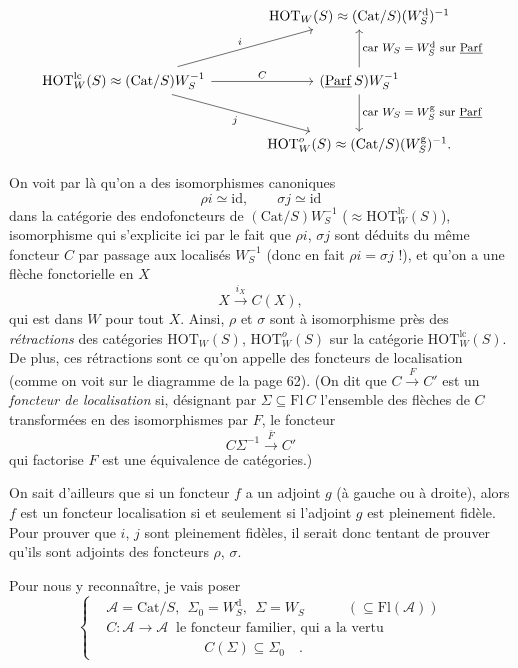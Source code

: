 \documentclass[11pt]{article}
\newcommand{\printedpage}[1]{\marginpar{\footnotesize p.~#1}}
\newcommand{\msp}[1]{\marginpar{\footnotesize [#1]}}
\newcommand{\HOT}{\mathrm{HOT}}
\newcommand{\Cat}{\mathrm{Cat}}
\newcommand{\Fl}{\mathrm{Fl}}
\newcommand{\id}{\mathrm{id}}
\newcommand{\cA}{\mathcal{A}}
\newcommand{\ul}[1]{\underline{\mathrm{#1}}}
\begin{document}
\printedpage{39}

\[
\begin{tikzcd}[column sep=large, row sep=large]
 & \HOT_W(S)\approx(\Cat/S)(W_S^{\mathrm{d}})^{-1} \\
\HOT^{\mathrm{lc}}_W(S)\approx(\Cat/S)W_S^{-1} \arrow[ur, "i"] \arrow[r, "C"] \arrow[dr, "j"'] & (\ul{Parf}\,S)W_S^{-1} \arrow[u, "\text{\footnotesize car $W_S=W_S^{\mathrm{d}}$ sur $\ul{Parf}$}"'] \arrow[d, "\text{\footnotesize car $W_S=W_S^{\mathrm{g}}$ sur $\ul{Parf}$}"] \\
 & \HOT^{o}_W(S)\approx(\Cat/S)(W_S^{\mathrm{g}})^{-1}.
\end{tikzcd}
\]

\msp{page 64}
On voit par là qu'on a des isomorphismes canoniques
\[
\rho i\simeq\id,\qquad\sigma j\simeq\id
\]
dans la catégorie des endofoncteurs de $(\Cat/S)W_S^{-1}$ ($\approx\HOT^{\mathrm{lc}}_W(S)$), isomorphisme qui s'explicite ici par le fait que $\rho i$, $\sigma j$ sont déduits du même foncteur $C$ par passage aux localisés $W_S^{-1}$ (donc en fait $\rho i=\sigma j$ !), et qu'on a une flèche fonctorielle en $X$
\[
X\xrightarrow{i_X}C(X),
\]
qui est dans $W$ pour tout $X$. Ainsi, $\rho$ et $\sigma$ sont à isomorphisme près des \textit{rétractions} des catégories $\HOT_W(S)$, $\HOT^{o}_W(S)$ sur la catégorie $\HOT^{\mathrm{lc}}_W(S)$. De plus, ces rétractions sont ce qu'on appelle des foncteurs de localisation (comme on voit sur le diagramme de la page 62). (On dit que $C\xrightarrow{F}C'$ est un \textit{foncteur de localisation} si, désignant par $\Sigma\subseteq\Fl\,C$ l'ensemble des flèches de $C$ transformées en des isomorphismes par $F$, le foncteur
\[
C\Sigma^{-1}\xrightarrow{\bar{F}}C'
\]
qui factorise $F$ est une équivalence de catégories.)

\msp{page 65}
On sait d'ailleurs que si un foncteur $f$ a un adjoint $g$ (à gauche ou à droite), alors $f$ est un foncteur localisation si et seulement si l'adjoint $g$ est pleinement fidèle. Pour prouver que $i$, $j$ sont pleinement fidèles, il serait donc tentant de prouver qu'ils sont adjoints des foncteurs $\rho$, $\sigma$.

Pour nous y reconnaître, je vais poser
\[
\left\{
\begin{aligned}
&\cA=\Cat/S,\ \ \Sigma_0=W_S^{\mathrm{d}},\ \ \Sigma=W_S\qquad\quad(\subseteq\Fl(\cA))\\
&C:\cA\longrightarrow\cA\ \text{ le foncteur familier, qui a la vertu}\\
&\qquad\qquad\qquad\quad C(\Sigma)\subseteq\Sigma_0\quad.
\end{aligned}
\right.
\]
\end{document}
